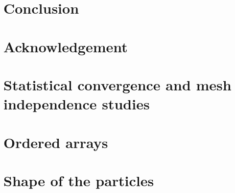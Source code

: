 \documentclass[12pt]{My_preprint}
\begin{document}
\section{Conclusion}


\section*{Acknowledgement}

\appendix
%
\section{Statistical convergence and mesh independence studies}

\section{Ordered arrays}

\section{Shape of the particles}
\label{app:shape}

\end{document}
